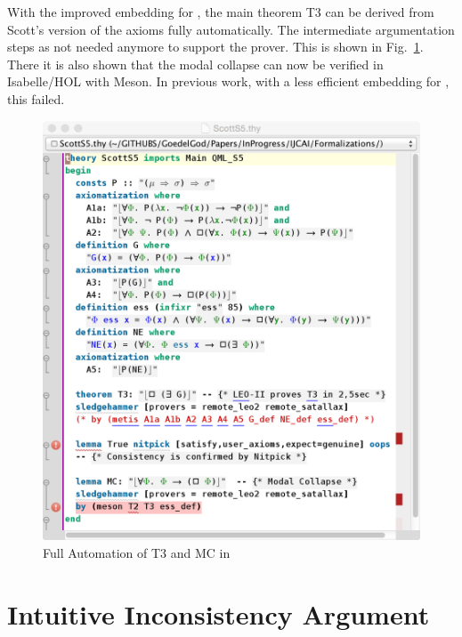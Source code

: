 \documentclass{article}
\begin{document}
With the improved embedding for \SFiveU, the main theorem T3 can be derived from Scott's version of the axioms fully automatically. The
intermediate argumentation steps as not needed anymore to support the
prover.  This is shown in Fig.~\ref{ScottS5}. There it is also shown that the modal collapse can now be verified in
Isabelle/HOL with Meson. In previous work, with a less efficient embedding for \SFive, this failed.
\begin{figure}
\centerline{\includegraphics[width=\columnwidth]{./Images/ScottS5.png}}
\caption{Full Automation of T3 and MC in \SFiveU } \label{ScottS5}
\end{figure}




\section{Intuitive Inconsistency Argument}
\end{document}
